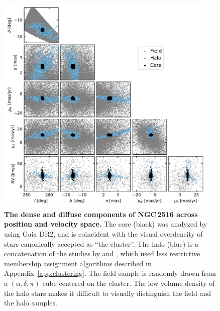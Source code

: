 \documentclass[12pt,twocolumn,tighten]{aastex63}
\begin{document}
\begin{figure}[t]
	\begin{center}
		\leavevmode
		\includegraphics[width=0.95\textwidth]{f1.pdf}
	\end{center}
	\vspace{-0.7cm}
  \caption{ {\bf The dense and diffuse components of NGC\,2516 across
  position and velocity space.} The core (black) was analyzed by
  \citet{cantatgaudin_gaia_2018} using Gaia DR2, and is coincident
  with the visual overdensity of stars canonically accepted as ``the
  cluster''.  The halo (blue) is a concatenation of the studies by
  \citet{kounkel_untangling_2019} and \citet{meingast_2021}, which
  used less restrictive membership assignment algorithms described in
  Appendix~\ref{app:clustering}.  The field sample is randomly drawn
  from a $(\alpha, \delta, \pi)$ cube centered on the cluster.  The
  low volume density of the halo stars makes it difficult to visually
  distinguish the field and the halo samples.
  \label{fig:gaia6d}
	}
\end{figure}
\end{document}
